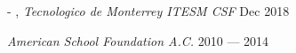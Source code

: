 
 - , \textit{Tecnologico de Monterrey ITESM CSF}	\hfill Dec 2018 \newline

\textit{American School Foundation A.C.} 	\hfill 2010 --- 2014


